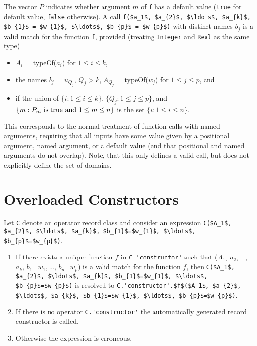 The vector $P$ indicates whether argument $m$ of \lstinline!f! has a default value (\lstinline!true! for default value, \lstinline!false! otherwise).
A call \lstinline!f($a_1$, $a_{2}$, $\ldots$, $a_{k}$, $b_{1}$ = $w_{1}$, $\ldots$, $b_{p}$ = $w_{p}$)! with distinct names $b_{j}$ is a valid match for the function \lstinline!f!, provided (treating \lstinline!Integer! and \lstinline!Real! as the same type)
\begin{itemize}
\item
  $A_{i}$ = typeOf($a_{i}$) for $1 \leq i \leq k$,
\item
  the names $b_{j}$ = $u_{Q_{j}}$, $Q_{j} > k$, $A_{Q_{j}}$ = typeOf($w_{j}$) for $1 \leq j \leq p$, and
\item
  if the union of $\{i: 1 \leq i \leq k \}$, $\{Q_{j}: 1 \leq j \leq p\}$, and $\{m: P_{m} \text{ is \lstinline!true! and } 1 \leq m \leq n \}$ is the set $\{i: 1 \leq i \leq n\}$.
\end{itemize}

\begin{nonnormative}
This corresponds to the normal treatment of function calls with named arguments, requiring that all inputs have some value given by a positional argument, named argument, or a default value (and that positional and named arguments do not overlap).
Note, that this only defines a valid call, but does not explicitly define the set of domains.
\end{nonnormative}

\section{Overloaded Constructors}\label{overloaded-constructors}

Let \lstinline!C! denote an operator record class and consider an expression \lstinline!C($A_1$, $a_{2}$, $\ldots$, $a_{k}$, $b_{1}$=$w_{1}$, $\ldots$, $b_{p}$=$w_{p}$)!.

\begin{enumerate}
\item\label{overloaded-constructor-unique}
  If there exists a unique function $f$ in \lstinline!C.'constructor'! such that ($A_1$, $a_{2}$, \ldots{}, $a_{k}$, $b_{1}$=$w_{1}$, \ldots{}, $b_{p}$=$w_{p}$) is a valid match for the function $f$, then
  \lstinline!C($A_1$, $a_{2}$, $\ldots$, $a_{k}$, $b_{1}$=$w_{1}$, $\ldots$, $b_{p}$=$w_{p}$)!
  is resolved to
  \lstinline!C.'constructor'.$f$($A_1$, $a_{2}$, $\ldots$, $a_{k}$, $b_{1}$=$w_{1}$, $\ldots$, $b_{p}$=$w_{p}$)!.
\item
  If there is no operator \lstinline!C.'constructor'! the automatically generated record constructor is called.
\item
  Otherwise the expression is erroneous.
\end{enumerate}


